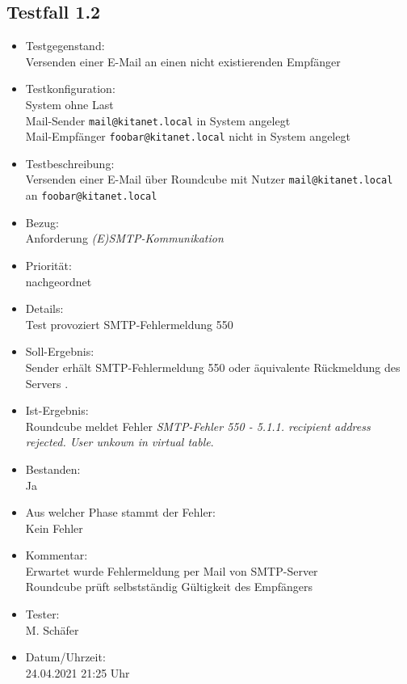 \subsection{Testfall 1.2}
\begin{itemize}
	\item Testgegenstand:\\
	Versenden einer E-Mail an einen nicht existierenden Empfänger
	\item Testkonfiguration:\\
	System ohne Last\\
	Mail-Sender \verb+mail@kitanet.local+ in System angelegt\\
	Mail-Empfänger \verb+foobar@kitanet.local+ nicht in System angelegt
	\item Testbeschreibung:\\
	Versenden einer E-Mail über Roundcube mit Nutzer \verb+mail@kitanet.local+ \\ an \verb+foobar@kitanet.local+
	\item Bezug:\\
	Anforderung \textit{(E)SMTP-Kommunikation}
	\item Priorität:\\
	nachgeordnet
	\item Details:\\
	Test provoziert SMTP-Fehlermeldung 550
	\item Soll-Ergebnis:\\
	Sender erhält SMTP-Fehlermeldung 550 oder äquivalente Rückmeldung des Servers \citep[vgl.][16]{rfc821}.
	\item Ist-Ergebnis:\\
	Roundcube meldet Fehler \textit{SMTP-Fehler 550 - 5.1.1. recipient address rejected. User unkown in virtual table}.
	\item Bestanden:\\
	Ja
	\item Aus welcher Phase stammt der Fehler:\\
	Kein Fehler
	\item Kommentar:\\
	Erwartet wurde Fehlermeldung per Mail von SMTP-Server\\
	Roundcube prüft selbstständig Gültigkeit des Empfängers
	\item Tester:\\
	M. Schäfer
	\item Datum/Uhrzeit:\\
	24.04.2021 21:25 Uhr
\end{itemize}

